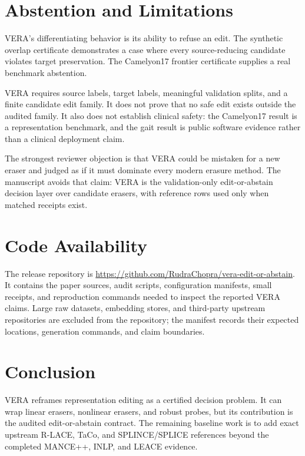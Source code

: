 \documentclass{article}
\begin{document}
\section{Abstention and Limitations}

VERA's differentiating behavior is its ability to refuse an edit. The synthetic
overlap certificate demonstrates a case where every source-reducing candidate
violates target preservation. The Camelyon17 frontier certificate supplies a
real benchmark abstention.

VERA requires source labels, target labels, meaningful validation splits, and a
finite candidate edit family. It does not prove that no safe edit exists
outside the audited family. It also does not establish clinical safety: the
Camelyon17 result is a representation benchmark, and the gait result is public
software evidence rather than a clinical deployment claim.

The strongest reviewer objection is that VERA could be mistaken for a new
eraser and judged as if it must dominate every modern erasure method. The
manuscript avoids that claim: VERA is the validation-only edit-or-abstain
decision layer over candidate erasers, with reference rows used only when
matched receipts exist.

\section{Code Availability}

The release repository is
\url{https://github.com/RudraChopra/vera-edit-or-abstain}. It contains the
paper sources, audit scripts, configuration manifests, small receipts, and
reproduction commands needed to inspect the reported VERA claims. Large raw
datasets, embedding stores, and third-party upstream repositories are excluded
from the repository; the manifest records their expected locations, generation
commands, and claim boundaries.

\section{Conclusion}

VERA reframes representation editing as a certified decision problem. It can
wrap linear erasers, nonlinear erasers, and robust probes, but its contribution
is the audited edit-or-abstain contract. The remaining baseline work is to add
exact upstream R-LACE, TaCo, and SPLINCE/SPLICE references beyond the completed
MANCE++, INLP, and LEACE evidence.
\end{document}
